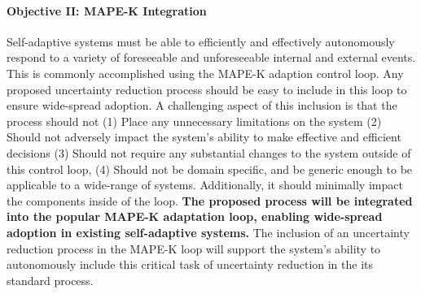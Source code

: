 \documentclass[12pt]{article}
\begin{document}
\vspace{-4mm}\paragraph{Objective II: MAPE-K Integration }Self-adaptive systems must be able to efficiently and effectively autonomously respond to a variety of foreseeable and unforeseeable internal and external events. This is commonly accomplished using the MAPE-K adaption control loop. Any proposed uncertainty reduction process should be easy to include in this loop to ensure wide-spread adoption. A challenging aspect of this inclusion is that the process should not (1) Place any unnecessary limitations on the system (2) Should not adversely impact the system's ability to make effective and efficient decisions (3) Should not require any substantial changes to the system outside of this control loop, (4) Should not be domain specific, and be generic enough to be applicable to a wide-range of systems. Additionally, it should minimally impact the components inside of the loop. {\bf The proposed process will be integrated into the popular MAPE-K adaptation loop, enabling wide-spread  adoption in existing self-adaptive systems.} The inclusion of an uncertainty reduction process in the MAPE-K loop will support the system's ability to autonomously include this critical task of uncertainty reduction in the its standard process.





\end{document}
